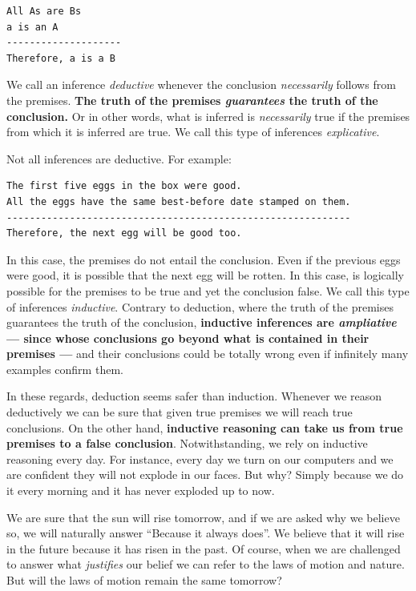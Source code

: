 \documentclass[
  12pt,
]{book}
\begin{document}
\begin{verbatim}
All As are Bs
a is an A
--------------------
Therefore, a is a B
\end{verbatim}

We call an inference \emph{deductive} whenever the conclusion \emph{necessarily} follows from the premises. \textbf{The truth of the premises \emph{guarantees} the truth of the conclusion.} Or in other words, what is inferred is \emph{necessarily} true if the premises from which it is inferred are true. We call this type of inferences \emph{explicative}.

Not all inferences are deductive. For example:

\begin{verbatim}
The first five eggs in the box were good.
All the eggs have the same best-before date stamped on them.
------------------------------------------------------------
Therefore, the next egg will be good too.
\end{verbatim}

In this case, the premises do not entail the conclusion. Even if the previous eggs were good, it is possible that the next egg will be rotten. In this case, is logically possible for the premises to be true and yet the conclusion false. We call this type of inferences \emph{inductive}. Contrary to deduction, where the truth of the premises guarantees the truth of the conclusion, \textbf{inductive inferences are \emph{ampliative} --- since whose conclusions go beyond what is contained in their premises ---} and their conclusions could be totally wrong even if infinitely many examples confirm them. \citep{bergadano1991problem}

In these regards, deduction seems safer than induction. Whenever we reason deductively we can be sure that given true premises we will reach true conclusions. On the other hand, \textbf{inductive reasoning can take us from true premises to a false conclusion}. Notwithstanding, we rely on inductive reasoning every day. For instance, every day we turn on our computers and we are confident they will not explode in our faces. \citep{okasha-pos} But why? Simply because we do it every morning and it has never exploded up to now.

We are sure that the sun will rise tomorrow, and if we are asked why we believe so, we will naturally answer ``Because it always does''. We believe that it will rise in the future because it has risen in the past. Of course, when we are challenged to answer what \emph{justifies} our belief we can refer to the laws of motion and nature. But will the laws of motion remain the same tomorrow? \citep{russell2001problems}
\end{document}
